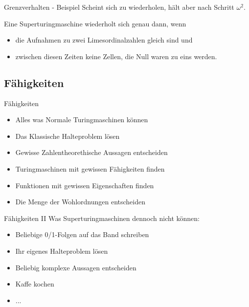 \begin{frame}[c]{Grenzverhalten - Beispiel}
    \pause
    Scheint sich zu wiederholen, hält aber nach Schritt $\omega^2$.

    \bigskip
    \pause
    Eine Superturingmaschine wiederholt sich genau dann, wenn
    \begin{itemize}
        \item die Aufnahmen zu zwei Limesordinalzahlen gleich sind und
        \item zwischen diesen Zeiten keine Zellen, die Null waren zu eins werden.
    \end{itemize}
\end{frame}


\subsection{Fähigkeiten}

\begin{frame}[c]{Fähigkeiten}
    \large
    \begin{itemize}
        \item Alles was Normale Turingmaschinen können
            \pause
        \item Das Klassische Halteproblem lösen
            \pause
        \item Gewisse Zahlentheorethische Aussagen entscheiden
            \pause
        \item Turingmaschinen mit gewissen Fähigkeiten finden
            \pause
        \item Funktionen mit gewissen Eigenschaften finden
            \pause
        \item Die Menge der Wohlordnungen entscheiden
    \end{itemize}
\end{frame}


\begin{frame}[c]{Fähigkeiten II}
    \Large
    Was Superturingmaschinen dennoch nicht können:
    \begin{itemize}
        \item Beliebige 0/1-Folgen auf das Band schreiben
            \pause
        \item Ihr eigenes Halteproblem lösen
            \pause
        \item Beliebig komplexe Aussagen entscheiden
            \pause
        \item Kaffe kochen
            \pause
        \item ...
    \end{itemize}
\end{frame}




